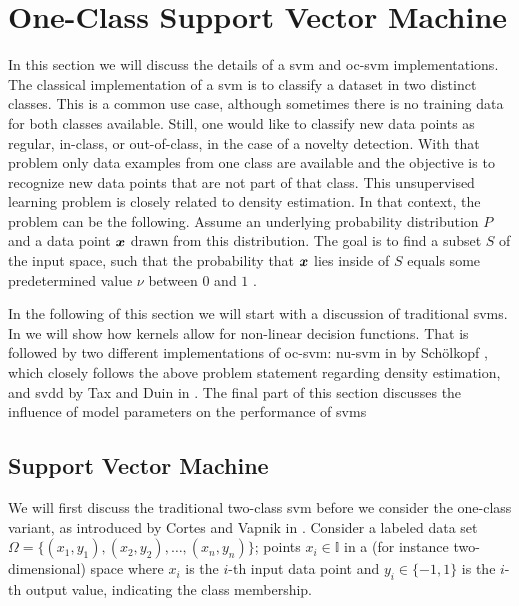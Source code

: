 \section{One-Class Support Vector Machine}\label{sec:one_class_svm}
In this section we will discuss the details of a \gls{svm} and \gls{oc-svm} implementations.
The classical implementation of a \gls{svm} is to classify a dataset in two distinct classes.
This is a common use case, although sometimes there is no training data for both classes available.
Still, one would like to classify new data points as regular, in-class, or out-of-class, \eg in the case of a novelty detection.
With that problem only data examples from one class are available and the objective is to recognize new data points that are not part of that class.
This unsupervised learning problem is closely related to density estimation.
In that context, the problem can be the following.
Assume an underlying probability distribution $P$ and a data point $\vectorsym{x}$ drawn from this distribution.
The goal is to find a subset $S$ of the input space, such that the probability that $\vectorsym{x}$ lies inside of $S$ equals some predetermined value $\nu$ between $0$ and $1$ \cite{scholkopf1999support}.

In the following of this section we will start with a discussion of traditional \glspl{svm}.
In  we will show how kernels allow for non-linear decision functions.
That is followed by two different implementations of \gls{oc-svm}: \gls{nu-svm} in  by Sch\"olkopf \etal \cite{scholkopf1999support}, which closely follows the above problem statement regarding density estimation, and \gls{svdd} by Tax and Duin \cite{tax1999support} in .
The final part of this section discusses the influence of model parameters on the performance of \glspl{svm}

\subsection{Support Vector Machine}\label{subsec:svm}
We will first discuss the traditional two-class \gls{svm} before we consider the one-class variant, as introduced by Cortes and Vapnik in \cite{cortes1995support}.
Consider a labeled data set $\Omega = \{ (x_1, y_1),\allowbreak (x_2, y_2), \dots , (x_n, y_n) \}$; points $x_i \in \mathbb{I}$ in a (for instance two-dimensional) space where $x_i$ is the $i$-th input data point and $y_i \in \{-1, 1\}$ is the $i$-th output value, indicating the class membership.

